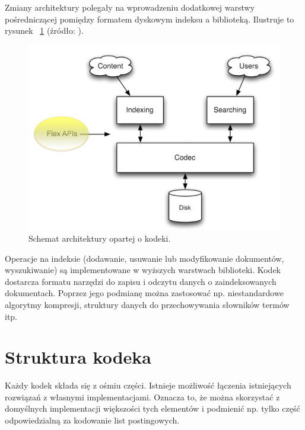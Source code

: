 Zmiany architektury polegały na wprowadzeniu dodatkowej warstwy pośredniczącej pomiędzy formatem dyskowym indeksu a biblioteką. Ilustruje to rysunek ~\ref{newarchitecture} (źródło: \cite{flexindex}).

\begin{figure}[here]
 \includegraphics[scale=0.5]{architecture.png}
 \caption{Schemat architektury opartej o kodeki.}
 \label{newarchitecture}
\end{figure}

Operacje na indeksie (dodawanie, usuwanie lub modyfikowanie dokumentów, wyszukiwanie) są implementowane w wyższych warstwach biblioteki. Kodek dostarcza formatu narzędzi do zapisu i odczytu danych o zaindeksowanych dokumentach. Poprzez jego podmianę można zastosować np. niestandardowe algorytmy kompresji, struktury danych do przechowywania słowników termów itp.

\section{Struktura kodeka}

Każdy kodek składa się z ośmiu części. Istnieje możliwość łączenia istniejących rozwiązań z własnymi implementacjami. Oznacza to, że można skorzystać z domyślnych implementacji większości tych elementów i podmienić np. tylko część odpowiedzialną za kodowanie list postingowych.

